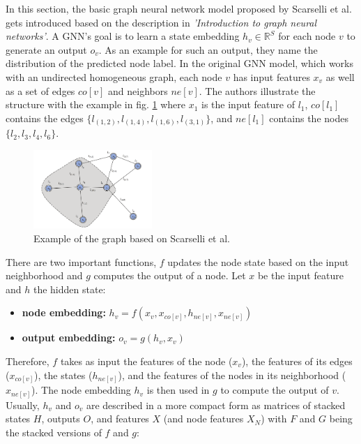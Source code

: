 \documentclass[a4paper,preprint]{sig-alternate}
\begin{document}
In this section, the basic graph neural network model proposed by Scarselli et al. \cite{Scarselli_2009} gets introduced
based on the description in \textit{'Introduction to graph neural networks'}\cite{Liu_2020}.
A GNN's goal is to learn a state embedding $h_v \in \mathbb{R}^S$ for each node $v$ to generate an output $o_v$.
As an example for such an output, they name the distribution of the predicted node label.
In the original GNN model, which works with an undirected homogeneous graph, each node $v$ has input features $x_v$
as well as a set of edges $co[v]$ and neighbors $ne[v]$. 
The authors illustrate the structure with the example in fig. \ref{fig:graph}
where $x_{1}$ is the input feature of $l_1$, $co[l_1]$ contains the edges $\{l_{(1, 2)}, l_{(1, 4)}, l_{(1, 6)}, l_{(3, 1)}\}$, and 
$ne[l_1]$ contains the nodes $\{l_2, l_3, l_4, l_6\}$.

\begin{figure}[h]
    \centering
    \includegraphics[width=0.4\textwidth]{img/graph.png}
    \caption{Example of the graph based on Scarselli et al. \cite{Liu_2020}}
    \label{fig:graph}
\end{figure}

There are two important functions, $f$ updates the node state based on the input neighborhood and $g$ computes the output of a node.
Let $x$ be the input feature and $h$ the hidden state:
\begin{itemize}
    \item \textbf{node embedding:} $h_v = f(x_v, x_{co[v]}, h_{ne[v]}, x_{ne[v]})$
    \item \textbf{output embedding:} $o_v = g(h_v, x_v)$
\end{itemize}

Therefore, $f$ takes as input the features of the node ($x_v$), the features of its edges ($x_{co[v]}$), the states ($h_{ne[v]}$),
and the features of the nodes in its neighborhood ($x_{ne[v]}$). The node embedding $h_v$ is then used in $g$ to compute the output of $v$.
Usually, $h_v$ and $o_v$ are described in a more compact form as matrices of stacked states $H$,
outputs $O$, and features $X$ (and node features $X_N$) with $F$ and $G$ being the stacked versions of $f$ and $g$:
\end{document}
